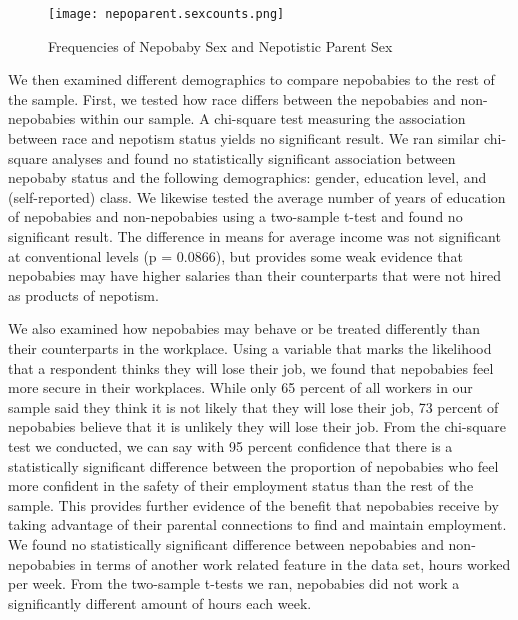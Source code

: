 \documentclass[12pt]{article}
\begin{document}
\begin{figure}
    \centering
    \texttt{[image: nepoparent.sexcounts.png]}
    \caption{Frequencies of Nepobaby Sex and Nepotistic Parent Sex}
    \label{fig:enter-label}
\end{figure}

We then examined different demographics to compare nepobabies to the rest of the sample. First, we tested how race differs between the nepobabies and non-nepobabies within our sample. A chi-square test measuring the association between race and nepotism status yields no significant result. We ran similar chi-square analyses and found no statistically significant association between nepobaby status and the following demographics: gender, education level, and (self-reported) class. We likewise tested the average number of years of education of nepobabies and non-nepobabies using a two-sample t-test and found no significant result. The difference in means for average income was not significant at conventional levels (p = 0.0866), but provides some weak evidence that nepobabies may have higher salaries than their counterparts that were not hired as products of nepotism.

We also examined how nepobabies may behave or be treated differently than their counterparts in the workplace. Using a variable that marks the likelihood that a respondent thinks they will lose their job, we found that nepobabies feel more secure in their workplaces. While only 65 percent of all workers in our sample said they think it is not likely that they will lose their job, 73 percent of nepobabies believe that it is unlikely they will lose their job. From the chi-square test we conducted, we can say with 95 percent confidence that there is a statistically significant difference between the proportion of nepobabies who feel more confident in the safety of their employment status than the rest of the sample. This provides further evidence of the benefit that nepobabies receive by taking advantage of their parental connections to find and maintain employment. We found no statistically significant difference between nepobabies and non-nepobabies in terms of another work related feature in the data set, hours worked per week. From the two-sample t-tests we ran, nepobabies did not work a significantly different amount of hours each week.
\end{document}
